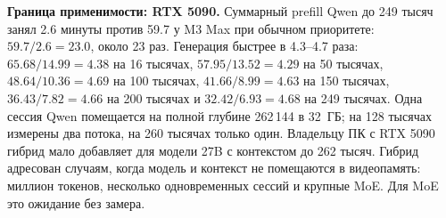 \textbf{Граница применимости: RTX 5090.} Суммарный prefill Qwen до 249 тысяч занял 2.6 минуты
против 59.7 у M3 Max при обычном приоритете: $59.7/2.6=23.0$, около 23 раз.
Генерация быстрее в 4.3--4.7 раза: $65.68/14.99=4.38$ на 16 тысячах,
$57.95/13.52=4.29$ на 50 тысячах, $48.64/10.36=4.69$ на 100 тысячах,
$41.66/8.99=4.63$ на 150 тысячах, $36.43/7.82=4.66$ на 200 тысячах
и $32.42/6.93=4.68$ на 249 тысячах. Одна сессия Qwen помещается на полной глубине 262\,144 в 32~ГБ;
на 128 тысячах измерены два потока, на 260 тысячах только один.
Владельцу ПК с RTX 5090 гибрид мало добавляет для модели 27B с контекстом до 262 тысяч.
Гибрид адресован случаям, когда модель и контекст не помещаются в видеопамять:
миллион токенов, несколько одновременных сессий и крупные MoE. Для MoE это ожидание без замера.
